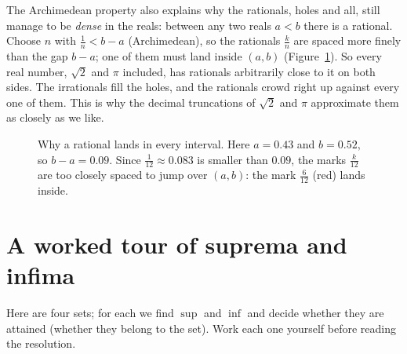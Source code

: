 \begin{connectionbox}
The Archimedean property also explains why the rationals, holes and all, still manage to be
\emph{dense} in the reals: between any two reals $a<b$ there is a rational. Choose $n$ with
$\frac1n < b-a$ (Archimedean), so the rationals $\frac{k}{n}$ are spaced more finely than
the gap $b-a$; one of them must land inside $(a,b)$ (Figure~\ref{ch41:fig-arch-density}). So
every real number, $\sqrt2$ and $\pi$ included, has rationals arbitrarily close to it on both
sides. The irrationals fill the holes, and the rationals crowd right up against every one of
them. This is why the decimal truncations of $\sqrt2$ and $\pi$ approximate them as closely as
we like.
\end{connectionbox}

\begin{figure}[H]
\centering
{}
\caption{Why a rational lands in every interval. Here $a=0.43$ and $b=0.52$, so $b-a=0.09$.
Since $\tfrac1{12}\approx0.083$ is smaller than $0.09$, the marks $\tfrac{k}{12}$ are too closely
spaced to jump over $(a,b)$: the mark $\tfrac{6}{12}$ (red) lands inside.}
\label{ch41:fig-arch-density}
\end{figure}

\section{A worked tour of suprema and infima}
\label{ch41:worked}

Here are four sets; for each we
find $\sup$ and $\inf$ and decide whether they are attained (whether they belong to the set).
Work each one yourself before reading the resolution.

